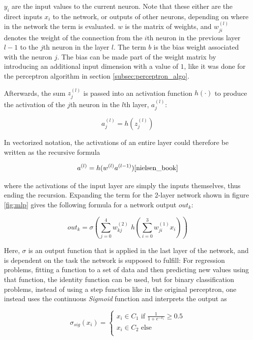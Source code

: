 \noindent $y_i$ are the input values to the current neuron. Note that these either are the direct inputs $x_i$ to the network, or outputs of other neurons, depending on where in the network the term is evaluated. $w$ is the matrix of weights, and $w^{(l)}_{ji}$ denotes the weight of the connection from the $i$th neuron in the previous layer $l - 1$ to the $j$th neuron in the  layer $l$. The term $b$ is the bias weight associated with the neuron $j$. The bias can be made part of the weight matrix by introducing an additional input dimension with a value of $1$, like it was done for the perceptron algorithm in section \ref{subsec:perceptron_algo}.

Afterwards, the sum $z^{(l)}_j$ is passed into an activation function $h(\cdot)$ to produce the activation of the $j$th neuron in the $l$th layer, $a_j^{(l)}$:

\[ a_j^{(l)} = h(z^{(l)}_j) \]

\noindent In vectorized notation, the activations of an entire layer could therefore be written as the recursive formula

\[ a^{(l)} = h(w^{(l)} a^{(l-1)}) \cite{nielsen_book} \]

\noindent where the activations of the input layer are simply the inputs themselves, thus ending the recursion. Expanding the term for the 2-layer network shown in figure \ref{fig:mlp} gives the following formula for a network output $out_k$:

\[ out_k = \sigma \left ( \sum \limits_{j=0}^{4} w^{(2)}_{kj}\,\, h \left ( \sum \limits_{i=0}^{3} w^{(1)}_{ji} x_i \right ) \right ) \label{eq:mlp_out} \]

\noindent Here, \textbf{$\sigma$} is an output function that is applied in the last layer of the network, and is dependent on the task the network is supposed to fulfill: For regression problems, fitting a function to a set of data and then predicting new values using that function, the identity function can be used, but for binary classification problems, instead of using a step function like in the original perceptron, one instead uses the continuous \textit{Sigmoid} function and interprets the output as

\[ \sigma_{sig}(x_i) = \begin{cases}
				x_i \in C_1 \text{ if } \frac{1}{1 + e^{-x_i}} \geq 0.5 \\
				x_i \in C_2 \text{ else }\\
			 \end{cases}
\]

